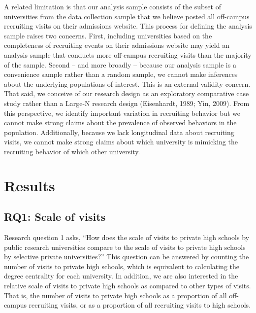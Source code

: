\documentclass[
  12pt,
]{article}
\begin{document}
A related limitation is that our analysis sample consists of the subset of universities from the data collection sample that we believe posted all off-campus recruiting visits on their admissions website. This process for defining the analysis sample raises two concerns. First, including universities based on the completeness of recruiting events on their admissions website may yield an analysis sample that conducts more off-campus recruiting visits than the majority of the sample. Second -- and more broadly -- because our analysis sample is a convenience sample rather than a random sample, we cannot make inferences about the underlying populations of interest. This is an external validity concern. That said, we conceive of our research design as an exploratory comparative case study rather than a Large-N research design (Eisenhardt, 1989; Yin, 2009). From this perspective, we identify important variation in recruiting behavior but we cannot make strong claims about the prevalence of observed behaviors in the population. Additionally, because we lack longitudinal data about recruiting visits, we cannot make strong claims about which university is mimicking the recruiting behavior of which other university.

\hypertarget{results}{%
\section{Results}\label{results}}

\hypertarget{rq1-scale-of-visits}{%
\subsection{RQ1: Scale of visits}\label{rq1-scale-of-visits}}

Research question 1 asks, ``How does the scale of visits to private high schools by public research universities compare to the scale of visits to private high schools by selective private universities?'' This question can be answered by counting the number of visits to private high schools, which is equivalent to calculating the degree centrality for each university. In addition, we are also interested in the relative scale of visits to private high schools as compared to other types of visits. That is, the number of visits to private high schools as a proportion of all off-campus recruiting visits, or as a proportion of all recruiting visits to high schools.
\end{document}
